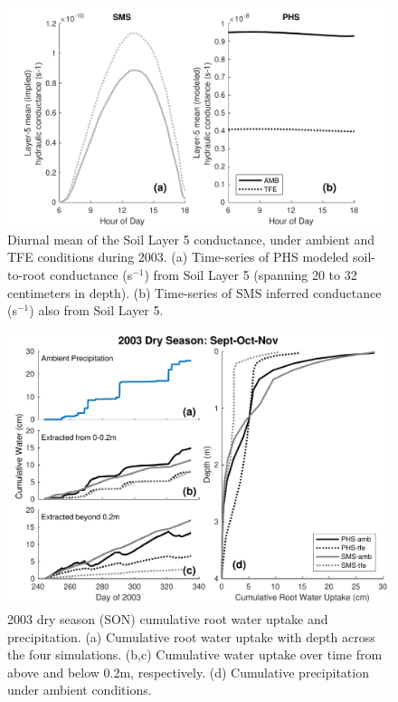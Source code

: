 \documentclass[draft,linenumbers]{agujournal}
\begin{document}
\clearpage   
  \begin{figure}[h]
     \centering
     \includegraphics[width=30pc]{../figs3/k.pdf}
     \caption{Diurnal mean of the Soil Layer 5 conductance, under ambient and TFE conditions during 2003. 
     (a) Time-series of PHS modeled soil-to-root conductance (s$^{-1}$) from Soil Layer 5 (spanning 20 to 32 centimeters in depth).
     (b) Time-series of SMS inferred conductance (s$^{-1}$) also from Soil Layer 5.
     }
     \label{fig:cond}
  \end{figure}
  

        \clearpage
    \begin{figure}[h]
     \centering
     \includegraphics[width=30pc]{../figs3/qdry.pdf}
     \caption{2003 dry season (SON) cumulative root water uptake and precipitation. 
     (a) Cumulative root water uptake with depth across the four simulations.
     (b,c) Cumulative water uptake over time from above and below 0.2m, respectively.
     (d) Cumulative precipitation under ambient conditions.
     }
     \label{fig7}
  \end{figure}
  
\end{document}
